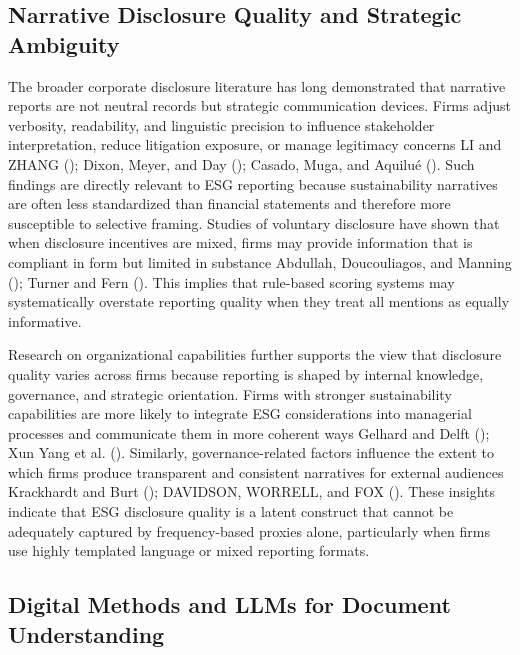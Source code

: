 \documentclass[
  12pt,
]{article}
\begin{document}
\subsection{Narrative Disclosure Quality and Strategic
Ambiguity}\label{narrative-disclosure-quality-and-strategic-ambiguity}

The broader corporate disclosure literature has long demonstrated that
narrative reports are not neutral records but strategic communication
devices. Firms adjust verbosity, readability, and linguistic precision
to influence stakeholder interpretation, reduce litigation exposure, or
manage legitimacy concerns LI and ZHANG ();
Dixon, Meyer, and Day (); Casado, Muga,
and Aquilué (). Such findings are directly
relevant to ESG reporting because sustainability narratives are often
less standardized than financial statements and therefore more
susceptible to selective framing. Studies of voluntary disclosure have
shown that when disclosure incentives are mixed, firms may provide
information that is compliant in form but limited in substance Abdullah,
Doucouliagos, and Manning (); Turner and
Fern (). This implies that rule-based
scoring systems may systematically overstate reporting quality when they
treat all mentions as equally informative.

Research on organizational capabilities further supports the view that
disclosure quality varies across firms because reporting is shaped by
internal knowledge, governance, and strategic orientation. Firms with
stronger sustainability capabilities are more likely to integrate ESG
considerations into managerial processes and communicate them in more
coherent ways Gelhard and Delft (); Xun
Yang et al. (). Similarly,
governance-related factors influence the extent to which firms produce
transparent and consistent narratives for external audiences Krackhardt
and Burt (); DAVIDSON, WORRELL, and
FOX (). These insights indicate that
ESG disclosure quality is a latent construct that cannot be adequately
captured by frequency-based proxies alone, particularly when firms use
highly templated language or mixed reporting formats.

\subsection{Digital Methods and LLMs for Document
Understanding}\label{digital-methods-and-llms-for-document-understanding}
\end{document}
